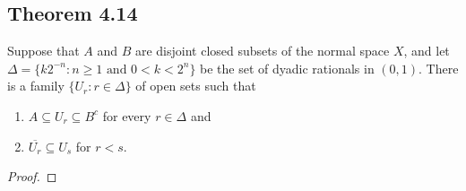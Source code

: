 \documentclass[../../main.tex]{subfiles}
\begin{document}
\subsection{Theorem 4.14}
\begin{wts}
    Suppose that $A$ and $B$ are disjoint closed subsets of the normal space $X$, and let $\Delta = \{k2^{-n}: n\geq 1 \text{ and } 0<k<2^n\}$ be the set of dyadic rationals in $(0,1)$. There is a family $\{U_r:r\in\Delta\}$ of open sets such that
    \begin{enumerate}
        \item $A\subseteq U_r\subseteq B^c$ for every $r\in \Delta$ and 
        \item $\overline{U_r}\subseteq U_s$ for $r<s$.
    \end{enumerate}
\end{wts}

\begin{proof}

\end{proof}
\end{document}
